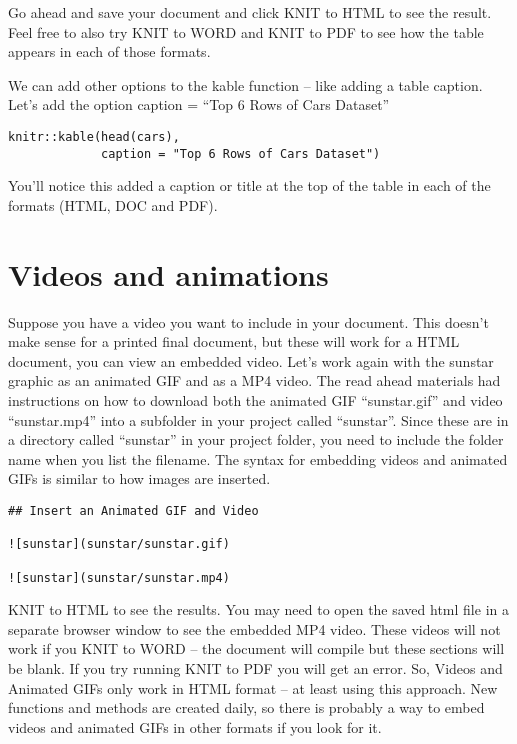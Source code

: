 \documentclass[
]{book}
\begin{document}
Go ahead and save your document and click KNIT to HTML to see the result. Feel free to also try KNIT to WORD and KNIT to PDF to see how the table appears in each of those formats.

We can add other options to the kable function -- like adding a table caption. Let's add the option caption = ``Top 6 Rows of Cars Dataset''

\begin{verbatim}
knitr::kable(head(cars),
             caption = "Top 6 Rows of Cars Dataset")
\end{verbatim}

You'll notice this added a caption or title at the top of the table in each of the formats (HTML, DOC and PDF).

\hypertarget{videos-and-animations}{%
\section{Videos and animations}\label{videos-and-animations}}

Suppose you have a video you want to include in your document. This doesn't make sense for a printed final document, but these will work for a HTML document, you can view an embedded video. Let's work again with the sunstar graphic as an animated GIF and as a MP4 video. The read ahead materials had instructions on how to download both the animated GIF ``sunstar.gif'' and video ``sunstar.mp4'' into a subfolder in your project called ``sunstar''. Since these are in a directory called ``sunstar'' in your project folder, you need to include the folder name when you list the filename. The syntax for embedding videos and animated GIFs is similar to how images are inserted.

\begin{verbatim}
## Insert an Animated GIF and Video

![sunstar](sunstar/sunstar.gif)

![sunstar](sunstar/sunstar.mp4)
\end{verbatim}

KNIT to HTML to see the results. You may need to open the saved html file in a separate browser window to see the embedded MP4 video. These videos will not work if you KNIT to WORD -- the document will compile but these sections will be blank. If you try running KNIT to PDF you will get an error. So, Videos and Animated GIFs only work in HTML format -- at least using this approach. New functions and methods are created daily, so there is probably a way to embed videos and animated GIFs in other formats if you look for it.
\end{document}
